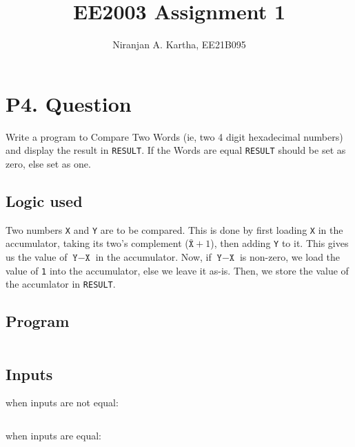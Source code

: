 \documentclass[11pt]{article}
\title{EE2003 Assignment 1 \vspace{-1em}}
\author{Niranjan A. Kartha, EE21B095\vspace{-3em}}
\date{}
\newenvironment{codeblock}{\captionsetup{type=codelisting}}{}
\begin{document}
\maketitle
\section*{P4. Question}
Write a program to Compare Two Words (ie, two 4 digit hexadecimal numbers) and display the result in \texttt{RESULT}. If the Words are equal \texttt{RESULT} should be set as zero, else set as one.

\subsection*{Logic used}
Two numbers \texttt{X} and \texttt{Y} are to be compared. This is done by first loading \texttt{X} in the accumulator, taking its two's complement ($\bar{\texttt{X}} + 1$), then adding \texttt{Y} to it. This gives us the value of $\texttt{Y} - \texttt{X}$ in the accumulator. Now, if $\texttt{Y} - \texttt{X}$ is non-zero, we load the value of \texttt{1} into the accumulator, else we leave it as-is. Then, we store the value of the accumlator in \texttt{RESULT}.

\subsection*{Program}

\begin{codeblock}
\inputminted[breaklines,
 mathescape,
 linenos,
 numbersep=5pt,
 frame=single,
 numbersep=5pt,
 xleftmargin=0pt]{asm}{program.s}
\end{codeblock}

\subsection*{Inputs}
when inputs are not equal:
\begin{codeblock}
\inputminted[breaklines,
 mathescape,
 linenos,
 numbersep=5pt,
 frame=single,
 numbersep=5pt,
 xleftmargin=0pt]{asm}{inputs1.s}
\end{codeblock}

when inputs are equal:
\begin{codeblock}
\inputminted[breaklines,
 mathescape,
 linenos,
 numbersep=5pt,
 frame=single,
 numbersep=5pt,
 xleftmargin=0pt]{asm}{inputs2.s}
\end{codeblock}
\end{document}
